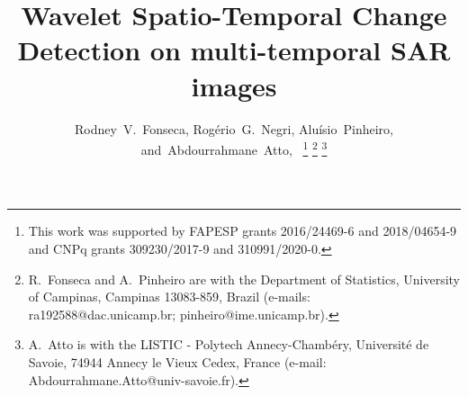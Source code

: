 \documentclass[journal]{IEEEtran}
\begin{document}
%
\title{Wavelet Spatio-Temporal Change Detection on multi-temporal SAR images}
%
%
%

\author{Rodney~V.~Fonseca, Rog\'{e}rio~G.~Negri,
        Alu\'{i}sio~Pinheiro,
        and~Abdourrahmane~Atto,~%
\thanks{This work was supported by FAPESP grants 2016/24469-6 and 2018/04654-9 and CNPq grants 309230/2017-9 and 310991/2020-0.}
\thanks{R.~Fonseca and A.~Pinheiro are with the Department of Statistics, University of Campinas, Campinas 13083-859, Brazil (e-mails: ra192588@dac.unicamp.br; pinheiro@ime.unicamp.br).}
\thanks{A.~Atto is with the LISTIC - Polytech Annecy-Chamb\'{e}ry, Universit\'{e} de Savoie, 74944 Annecy le Vieux Cedex, France (e-mail: Abdourrahmane.Atto@univ-savoie.fr).}}

% 
%
\end{document}

